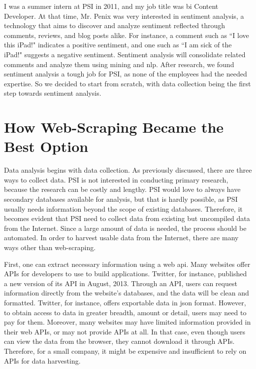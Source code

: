 \documentclass[12pt,twoside,draft]{report}
\begin{document}
I was a summer intern at PSI in 2011, and my job title was \gls{bi} Content Developer. At that time, Mr. Penix was very interested in sentiment analysis, a technology that aims to discover and analyze sentiment reflected through comments, reviews, and blog posts alike. For instance, a comment such as ``I love this iPad!" indicates a positive sentiment, and one such as ``I am sick of the iPad!" suggests a negative sentiment. Sentiment analysis will consolidate related comments and analyze them using \gls{mining} and \gls{nlp}. After research, we found sentiment analysis a tough job for PSI, as none of the employees had the needed expertise. So we decided to start from scratch, with data collection being the first step towards sentiment analysis.

\section{How Web-Scraping Became the Best Option}

Data analysis begins with data collection. As previously discussed, there are three ways to collect data. PSI is not interested in conducting primary research, because the research can be costly and lengthy. PSI would love to always have secondary databases available for analysis, but that is hardly possible, as PSI usually needs information beyond the scope of existing databases. Therefore, it becomes evident that PSI need to collect data from existing but uncompiled data from the Internet. Since a large amount of data is needed, the process should be automated. In order to \gls{harvest} usable data from the Internet, there are many ways other than web-scraping.

First, one can extract necessary information using a web \gls{api}. Many websites offer APIs for developers to use to build applications. Twitter, for instance, published a new version of its API in August, 2013. Through an API, users can request information directly from the website's databases, and the data will be clean and formatted. Twitter, for instance, offers exportable data in \gls{json} format. However, to obtain access to data in greater breadth, amount or detail, users may need to pay for them. Moreover, many websites may have limited information provided in their web APIs, or may not provide APIs at all. In that case, even though users can view the data from the browser, they cannot download it through APIs. Therefore, for a small company, it might be expensive and insufficient to rely on APIs for data harvesting.
\end{document}
